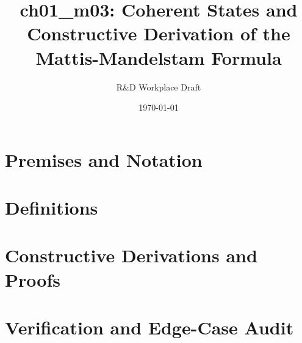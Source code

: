 \documentclass[11pt,a4paper]{article}
\title{\textbf{ch01\_m03: Coherent States and Constructive Derivation of the Mattis-Mandelstam Formula}}
\author{R\&D Workplace Draft}
\date{\today}
\theoremstyle{definition}
\theoremstyle{plain}
\theoremstyle{remark}
\begin{document}
\maketitle

\section{Premises and Notation}

\section{Definitions}

\section{Constructive Derivations and Proofs}

\section{Verification and Edge-Case Audit}
\end{document}
